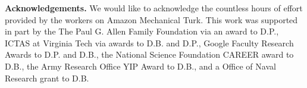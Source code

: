 {
\textbf{Acknowledgements.}
We would like to acknowledge the countless hours of effort provided by the workers on Amazon Mechanical Turk. This work was supported in part by the The Paul G. Allen Family Foundation via an award to D.P., ICTAS at Virginia Tech via awards to D.B. and D.P., Google Faculty Research Awards to D.P. and D.B., the National Science Foundation CAREER award to D.B., the Army Research Office YIP Award to D.B., and a Office of Naval Research grant to D.B.
}
\begin{comment}








\end{comment}